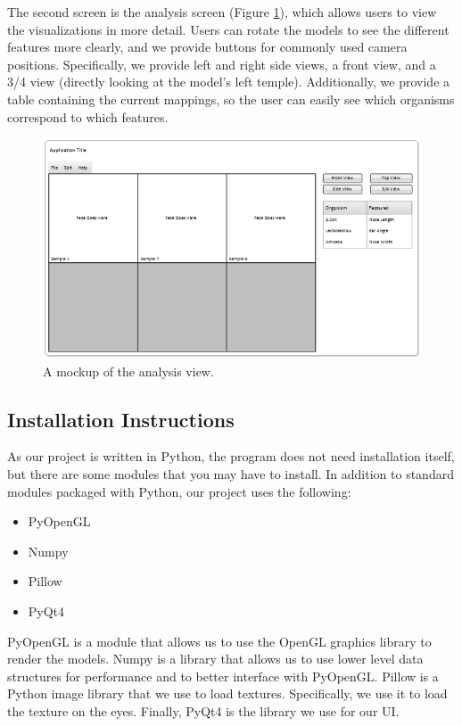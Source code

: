 \documentclass[letterpaper,10pt, onecolumn, draftclsnofoot]{IEEEtran}
\begin{document}
The second screen is the analysis screen (Figure \ref{fig:analysis2}), which allows users to view the visualizations in more detail. Users can rotate the models to see the different features more clearly, and we provide buttons for commonly used camera positions. Specifically, we provide left and right side views, a front view, and a 3/4 view (directly looking at the model's left temple). Additionally, we provide a table containing the current mappings, so the user can easily see which organisms correspond to which features.

\begin{figure}[h]
	\includegraphics[width=\textwidth]{analysisMenu.PNG}
	\caption{A mockup of the analysis view.}
	\label{fig:analysis2}
\end{figure}

\subsection{Installation Instructions}
\label{sec:Installation Instructions}
As our project is written in Python, the program does not need installation itself, but there are some modules that you may have to install. In addition to standard modules packaged with Python, our project uses the following:

\begin{itemize}
	\item PyOpenGL
	\item Numpy
	\item Pillow
	\item PyQt4
\end{itemize}

PyOpenGL is a module that allows us to use the OpenGL graphics library to render the models. Numpy is a library that allows us to use lower level data structures for performance and to better interface with PyOpenGL. Pillow is a Python image library that we use to load textures. Specifically, we use it to load the texture on the eyes. Finally, PyQt4 is the library we use for our UI.
\end{document}
